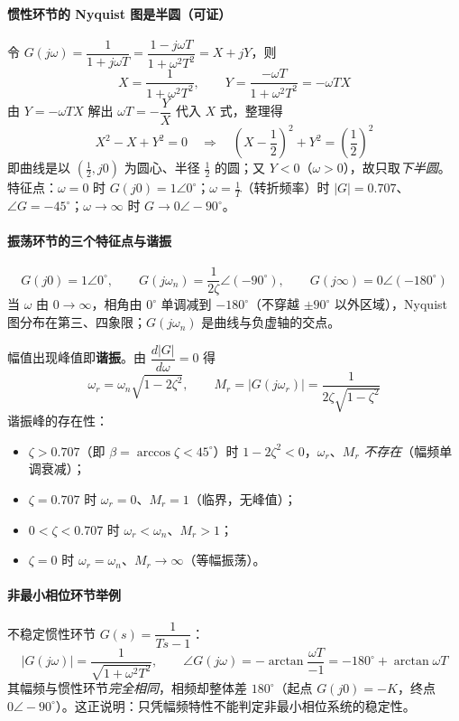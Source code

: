 \paragraph{惯性环节的 Nyquist 图是半圆（可证）}
令 $G(j\omega)=\dfrac{1}{1+j\omega T}=\dfrac{1-j\omega T}{1+\omega^2T^2}=X+jY$，则
\[
X=\frac{1}{1+\omega^2T^2},\qquad Y=\frac{-\omega T}{1+\omega^2T^2}=-\omega TX
\]
由 $Y=-\omega TX$ 解出 $\omega T=-\dfrac{Y}{X}$ 代入 $X$ 式，整理得
\[
X^2-X+Y^2=0\quad\Longrightarrow\quad \left(X-\frac12\right)^2+Y^2=\left(\frac12\right)^2
\]
即曲线是以 $(\tfrac12,j0)$ 为圆心、半径 $\tfrac12$ 的圆；又 $Y<0$（$\omega>0$），故只取\emph{下半圆}。特征点：$\omega=0$ 时 $G(j0)=1\angle0^\circ$；$\omega=\frac1T$（转折频率）时 $|G|=0.707$、$\angle G=-45^\circ$；$\omega\to\infty$ 时 $G\to0\angle-90^\circ$。

\paragraph{振荡环节的三个特征点与谐振}
\[
G(j0)=1\angle0^\circ,\qquad
G(j\omega_n)=\frac{1}{2\zeta}\angle(-90^\circ),\qquad
G(j\infty)=0\angle(-180^\circ)
\]
当 $\omega$ 由 $0\to\infty$，相角由 $0^\circ$ 单调减到 $-180^\circ$（不穿越 $\pm90^\circ$ 以外区域），Nyquist 图分布在第三、四象限；$G(j\omega_n)$ 是曲线与负虚轴的交点。

幅值出现峰值即\textbf{谐振}。由 $\dfrac{d|G|}{d\omega}=0$ 得
\[
\omega_r=\omega_n\sqrt{1-2\zeta^2},\qquad
M_r=|G(j\omega_r)|=\frac{1}{2\zeta\sqrt{1-\zeta^2}}
\]
谐振峰的存在性：
\begin{itemize}
    \item $\zeta>0.707$（即 $\beta=\arccos\zeta<45^\circ$）时 $1-2\zeta^2<0$，$\omega_r$、$M_r$ \emph{不存在}（幅频单调衰减）；
    \item $\zeta=0.707$ 时 $\omega_r=0$、$M_r=1$（临界，无峰值）；
    \item $0<\zeta<0.707$ 时 $\omega_r<\omega_n$、$M_r>1$；
    \item $\zeta=0$ 时 $\omega_r=\omega_n$、$M_r\to\infty$（等幅振荡）。
\end{itemize}

\paragraph{非最小相位环节举例}
不稳定惯性环节 $G(s)=\dfrac{1}{Ts-1}$：
\[
|G(j\omega)|=\frac{1}{\sqrt{1+\omega^2T^2}},\qquad
\angle G(j\omega)=-\arctan\frac{\omega T}{-1}=-180^\circ+\arctan\omega T
\]
其幅频与惯性环节\emph{完全相同}，相频却整体差 $180^\circ$（起点 $G(j0)=-K$，终点 $0\angle-90^\circ$）。这正说明：只凭幅频特性不能判定非最小相位系统的稳定性。

